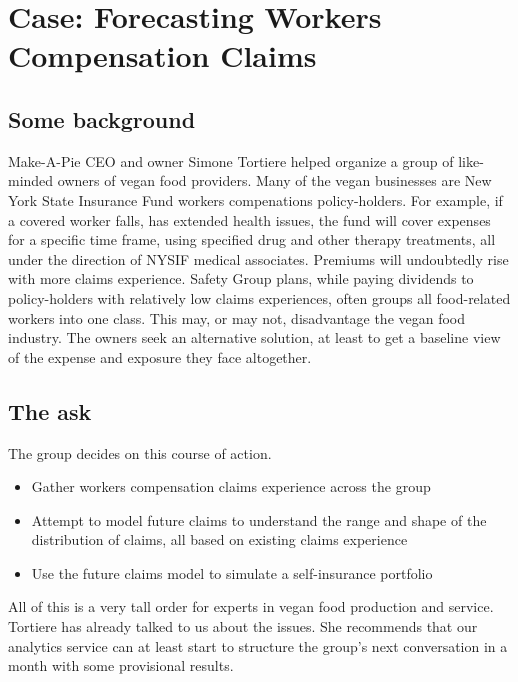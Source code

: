 \documentclass[
]{book}
\begin{document}
\hypertarget{case-forecasting-workers-compensation-claims}{%
\chapter{Case: Forecasting Workers Compensation Claims}\label{case-forecasting-workers-compensation-claims}}

\hypertarget{some-background}{%
\section{Some background}\label{some-background}}

Make-A-Pie CEO and owner Simone Tortiere helped organize a group of like-minded owners of vegan food providers. Many of the vegan businesses are New York State Insurance Fund workers compenations policy-holders. For example, if a covered worker falls, has extended health issues, the fund will cover expenses for a specific time frame, using specified drug and other therapy treatments, all under the direction of NYSIF medical associates. Premiums will undoubtedly rise with more claims experience. Safety Group plans, while paying dividends to policy-holders with relatively low claims experiences, often groups all food-related workers into one class. This may, or may not, disadvantage the vegan food industry. The owners seek an alternative solution, at least to get a baseline view of the expense and exposure they face altogether.

\hypertarget{the-ask}{%
\section{The ask}\label{the-ask}}

The group decides on this course of action.

\begin{itemize}
\item
  Gather workers compensation claims experience across the group
\item
  Attempt to model future claims to understand the range and shape of the distribution of claims, all based on existing claims experience
\item
  Use the future claims model to simulate a self-insurance portfolio
\end{itemize}

All of this is a very tall order for experts in vegan food production and service. Tortiere has already talked to us about the issues. She recommends that our analytics service can at least start to structure the group's next conversation in a month with some provisional results.
\end{document}
